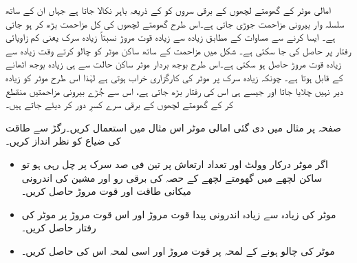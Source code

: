 	امالی موٹر کے گھومتے لچھوں کے برقی سروں کو  کے ذریعہ باہر نکالا جاتا ہے جہاں ان کے ساتھ سلسلہ وار بیرونی مزاحمت جوڑی جاتی ہے۔اس طرح گھومتے لچھوں کی کل مزاحمت بڑھ کر  ہو جاتی ہے۔ ایسا کرنے سے مساوات   کے مطابق زیادہ سے زیادہ قوت مروڑ نسبتاً زیادہ سرک یعنی کم زاویائی رفتار پر حاصل کی جا سکتی ہے۔ شکل  میں مزاحمت  کے ساتھ ساکن موٹر کو چالو کرتے وقت زیادہ سے زیادہ قوت مروڑ حاصل ہو سکتی ہے۔اس طرح بوجھ بردار موٹر ساکن حالت سے ہی زیادہ بوجھ اٹھانے کے قابل ہوتا ہے۔ چونکہ زیادہ سرک پر موٹر کی کارگزاری خراب ہوتی ہے لہٰذا اس طرح موٹر کو زیادہ دیر نہیں چلایا جاتا اور جیسے ہی اس کی رفتار بڑھ جاتی ہے، اس سے جُڑے بیرونی مزاحمتیں منقطع کر کے گھومتے لچھوں کے برقی سرے کسرِ دور کر دیئے جاتے ہیں۔

صفحہ  پر مثال   میں دی گئی امالی موٹر اس مثال میں استعمال کریں۔رگڑ سے طاقت کی ضیاع کو نظر انداز کریں۔
\begin{itemize}
\item
اگر موٹر درکار وولٹ اور تعداد ارتعاش پر تین فی صد سرک پر چل رہی ہو تو  ساکن لچھے میں گھومتے لچھے کے حصہ کی برقی رو  اور مشین کی اندرونی میکانی طاقت اور قوت مروڑ حاصل کریں۔
\item
موٹر کی زیادہ سے زیادہ اندرونی پیدا قوت مروڑ اور اس قوت مروڑ پر موٹر کی رفتار حاصل کریں۔
\item
موٹر کی چالو ہونے کے لمحہ پر قوت مروڑ اور اسی لمحہ اس کی   حاصل کریں۔ 
\end{itemize}

